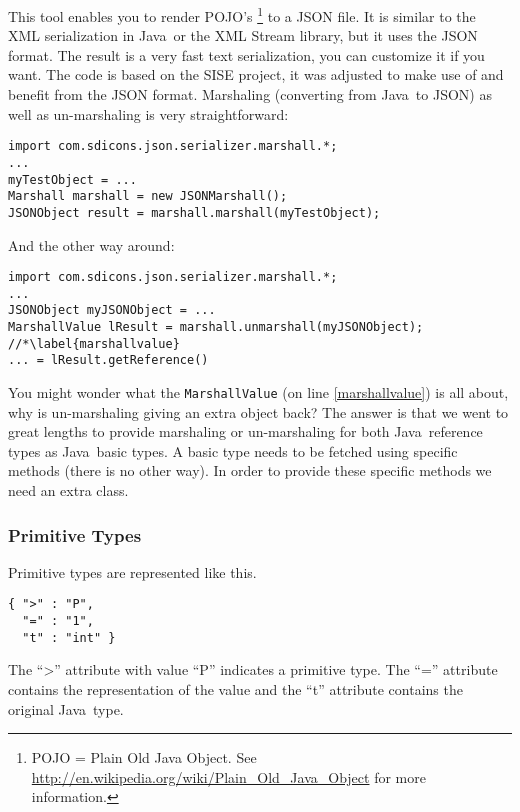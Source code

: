\documentclass[a4paper]{article}
\newcommand{\java}{Java}
\begin{document}
This tool enables you to render POJO's \footnote{POJO = Plain Old Java Object. See \url{http://en.wikipedia.org/wiki/Plain_Old_Java_Object} for more information.}  to a JSON file. It is similar to the XML serialization in \java\ or the XML Stream library, but it uses the JSON format. The result is a very fast text serialization, you can customize it if you want.  The code is based on the SISE project, it was adjusted to make use of and benefit from the JSON format. Marshaling (converting from \java\ to JSON) as well as un-marshaling is very straightforward:

\medskip
\begin{lstlisting}
import com.sdicons.json.serializer.marshall.*;
...
myTestObject = ...
Marshall marshall = new JSONMarshall();
JSONObject result = marshall.marshall(myTestObject);
\end{lstlisting}
\medskip

And the other way around:
 
\medskip
\begin{lstlisting}
import com.sdicons.json.serializer.marshall.*;
...
JSONObject myJSONObject = ...
MarshallValue lResult = marshall.unmarshall(myJSONObject); //*\label{marshallvalue}
... = lResult.getReference()
\end{lstlisting}
\medskip

You might wonder what the \lstinline{MarshallValue} (on line \ref{marshallvalue}) is all about, why is un-marshaling giving an extra object back? The answer is that we went to great lengths to provide marshaling or un-marshaling for both \java\ reference types as \java\ basic types. A basic type needs to be fetched using specific methods (there is no other way). In order to provide these specific methods we need an extra class.

\subsubsection{Primitive Types}

Primitive types are represented like this.

\medskip
\begin{lstlisting}
{ ">" : "P",
  "=" : "1",
  "t" : "int" }
\end{lstlisting}
\medskip

The ``>''  attribute with value ``P''  indicates a primitive type. The ``=''  attribute contains the representation of the value and the ``t'' attribute contains the original \java\ type.
\end{document}
